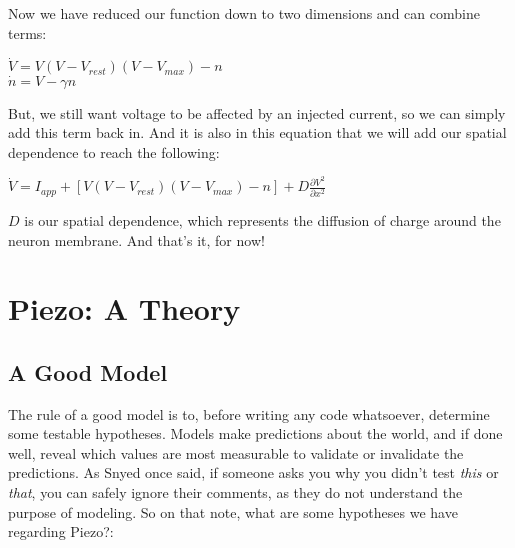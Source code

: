 \documentclass[12pt]{amsart}
\begin{document}
Now we have reduced our function down to two dimensions and can combine terms: 

\bigskip

\begin{center}

    $\dot{V} = V(V - V_{rest})(V - V_{max}) - n$\\
    $\dot{n} = V - \gamma n$
    
\end{center}

\bigskip

But, we still want voltage to be affected by an injected current, so we can simply add this term back in. And it is also in this equation that we will add our spatial dependence to reach the following: 

\bigskip

\begin{center}

    $\dot{V} = I_{app} + [V(V - V_{rest})(V - V_{max}) - n] +  D\frac{\partial V^2}{\partial x^2}$\\
    
\end{center}

\bigskip

$D$ is our spatial dependence, which represents the diffusion of charge around the neuron membrane. And that's it, for now! 

\section{Piezo: A Theory}

\subsection{A Good Model} The rule of a good model is to, before writing any code whatsoever, determine some testable hypotheses. Models make predictions about the world, and if done well, reveal which values are most measurable to validate or invalidate the predictions. As Snyed once said, if someone asks you why you didn't test \textit{this} or \textit{that}, you can safely ignore their comments, as they do not understand the purpose of modeling. So on that note, what are some hypotheses we have regarding Piezo?:\newline
\end{document}
